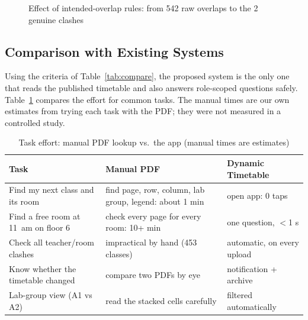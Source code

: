\begin{figure}[H]
\centering
{}
\caption{Effect of intended-overlap rules: from 542 raw overlaps to the 2 genuine clashes}
\label{fig:conflictbar}
\end{figure}

\subsection{Comparison with Existing Systems}
Using the criteria of Table~\ref{tab:compare}, the proposed system is the only one that reads the
published timetable and also answers role-scoped questions safely. Table~\ref{tab:effort} compares
the effort for common tasks. The manual times are our own estimates from trying each task with the PDF;
they were not measured in a controlled study.

\begin{table}[H]
\centering
\caption{Task effort: manual PDF lookup vs.\ the app (manual times are estimates)}
\label{tab:effort}
\small
\begin{tabularx}{\textwidth}{@{}Xp{3.5cm}p{3.5cm}@{}}
\toprule
\textbf{Task} & \textbf{Manual PDF} & \textbf{Dynamic Timetable}\\
\midrule
Find my next class and its room & find page, row, column, lab group, legend: about 1 min & open app: 0 taps\\
Find a free room at 11~am on floor 6 & check every page for every room: 10+ min & one question, $<$1 s\\
Check all teacher/room clashes & impractical by hand (453 classes) & automatic, on every upload\\
Know whether the timetable changed & compare two PDFs by eye & notification + archive\\
Lab-group view (A1 vs A2) & read the stacked cells carefully & filtered automatically\\
\bottomrule
\end{tabularx}
\end{table}

